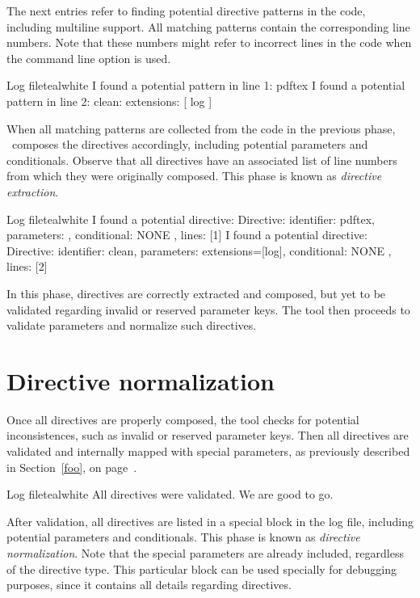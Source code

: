 The next entries refer to finding potential directive patterns in the code, including multiline support. All matching patterns contain the corresponding line numbers. Note that these numbers might refer to incorrect lines in the code when the  command line option is used.

\begin{codebox}{Log file}{teal}{\icnote}{white}
I found a potential pattern in line 1: pdftex
I found a potential pattern in line 2: clean: { extensions: [ log ] }
\end{codebox}

When all matching patterns are collected from the code in the previous phase, \arara\ composes the directives accordingly, including potential parameters and conditionals. Observe that all directives have an associated list of line numbers from which they were originally composed. This phase is known as \emph{directive extraction}.

\begin{codebox}{Log file}{teal}{\icnote}{white}
I found a potential directive: Directive: { identifier: pdftex,
parameters: {}, conditional: { NONE }, lines: [1] }
I found a potential directive: Directive: { identifier: clean,
parameters: {extensions=[log]}, conditional: { NONE }, lines: [2] }
\end{codebox}

In this phase, directives are correctly extracted and composed, but yet to be validated regarding invalid or reserved parameter keys. The tool then proceeds to validate parameters and normalize such directives.

\section{Directive normalization}
\label{sec:directivenormalization}

Once all directives are properly composed, the tool checks for potential inconsistences, such as invalid or reserved parameter keys. Then all directives are validated and internally mapped with special parameters, as previously described in Section~\ref{foo}, on page~\pageref{foo}.

\begin{codebox}{Log file}{teal}{\icnote}{white}
All directives were validated. We are good to go.
\end{codebox}

After validation, all directives are listed in a special block in the log file, including potential parameters and conditionals. This phase is known as \emph{directive normalization}. Note that the special parameters are already included, regardless of the directive type.  This particular block can be used specially for debugging purposes, since it contains all details regarding directives.

